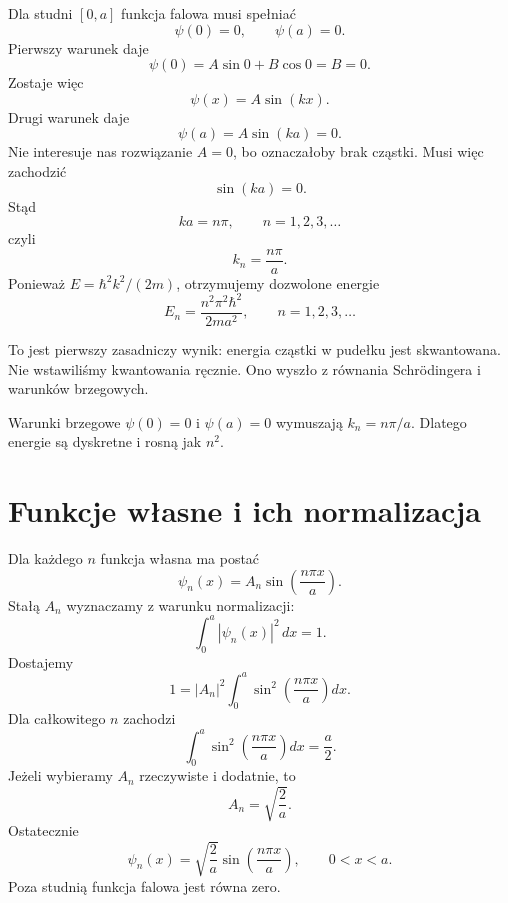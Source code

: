 Dla studni \([0,a]\) funkcja falowa musi spełniać
\begin{equation}
\psi(0)=0,
\qquad
\psi(a)=0.
\end{equation}
Pierwszy warunek daje
\[
\psi(0)=A\sin 0+B\cos 0=B=0.
\]
Zostaje więc
\[
\psi(x)=A\sin(kx).
\]
Drugi warunek daje
\[
\psi(a)=A\sin(ka)=0.
\]
Nie interesuje nas rozwiązanie \(A=0\), bo oznaczałoby brak cząstki. Musi więc zachodzić
\begin{equation}
\sin(ka)=0.
\end{equation}
Stąd
\begin{equation}
ka=n\pi,
\qquad n=1,2,3,\ldots
\end{equation}
czyli
\begin{equation}
k_n=\frac{n\pi}{a}.
\end{equation}
Ponieważ \(E=\hbar^2 k^2/(2m)\), otrzymujemy dozwolone energie
\begin{equation}
E_n=\frac{n^2\pi^2\hbar^2}{2ma^2},
\qquad n=1,2,3,\ldots
\end{equation}

To jest pierwszy zasadniczy wynik: energia cząstki w pudełku jest skwantowana. Nie wstawiliśmy kwantowania ręcznie. Ono wyszło z równania Schrödingera i warunków brzegowych.

\begin{summarybox}
Warunki brzegowe \(\psi(0)=0\) i \(\psi(a)=0\) wymuszają \(k_n=n\pi/a\). Dlatego energie są dyskretne i rosną jak \(n^2\).
\end{summarybox}

\section{Funkcje własne i ich normalizacja}

Dla każdego \(n\) funkcja własna ma postać
\[
\psi_n(x)=A_n\sin\left(\frac{n\pi x}{a}\right).
\]
Stałą \(A_n\) wyznaczamy z warunku normalizacji:
\begin{equation}
\int_0^a |\psi_n(x)|^2\,dx=1.
\end{equation}
Dostajemy
\[
1=|A_n|^2\int_0^a \sin^2\left(\frac{n\pi x}{a}\right)dx.
\]
Dla całkowitego \(n\) zachodzi
\[
\int_0^a \sin^2\left(\frac{n\pi x}{a}\right)dx=\frac{a}{2}.
\]
Jeżeli wybieramy \(A_n\) rzeczywiste i dodatnie, to
\begin{equation}
A_n=\sqrt{\frac{2}{a}}.
\end{equation}
Ostatecznie
\begin{equation}
\psi_n(x)=\sqrt{\frac{2}{a}}\sin\left(\frac{n\pi x}{a}\right),
\qquad 0<x<a.
\end{equation}
Poza studnią funkcja falowa jest równa zero.

